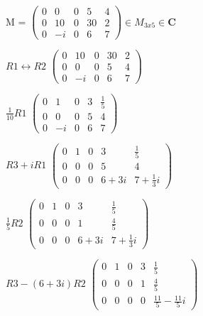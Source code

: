 \documentclass[12pt]{article}
\begin{document}
\begin{center}
M =
$\begin{pmatrix}
  0 & 0 & 0 & 5 & 4\\
  0 & 10 & 0 & 30 & 2\\
  0 & -i & 0 & 6 & 7
\end{pmatrix} \in M_{3x5} \in \mathbf{C}$
\end{center}

\begin{center}
$R1 \longleftrightarrow R2$
$\begin{pmatrix}
  0 & 10 & 0 & 30 & 2\\
  0 & 0 & 0 & 5 & 4\\
  0 & -i & 0 & 6 & 7
\end{pmatrix}$
\end{center}

\begin{center}
$\frac{1}{10}R1$
$\begin{pmatrix}
  0 & 1 & 0 & 3 & \frac{1}{5}\\
  0 & 0 & 0 & 5 & 4\\
  0 & -i & 0 & 6 & 7
\end{pmatrix}$
\end{center}

\begin{center}
$R3 + iR1$
$\begin{pmatrix}
  0 & 1 & 0 & 3 & \frac{1}{5}\\
  0 & 0 & 0 & 5 & 4\\
  0 & 0 & 0 & 6+3i & 7+\frac{1}{3}i
\end{pmatrix}$
\end{center}

\begin{center}
$\frac{1}{5}R2$
$\begin{pmatrix}
  0 & 1 & 0 & 3 & \frac{1}{5}\\
  0 & 0 & 0 & 1 & \frac{4}{5}\\
  0 & 0 & 0 & 6+3i & 7+\frac{1}{3}i
\end{pmatrix}$
\end{center}

\begin{center}
$R3 - (6+3i)R2$
$\begin{pmatrix}
  0 & 1 & 0 & 3 & \frac{1}{5}\\
  0 & 0 & 0 & 1 & \frac{4}{5}\\
  0 & 0 & 0 & 0 & \frac{11}{5} - \frac{11}{5}i
\end{pmatrix}$
\end{center}
\end{document}
